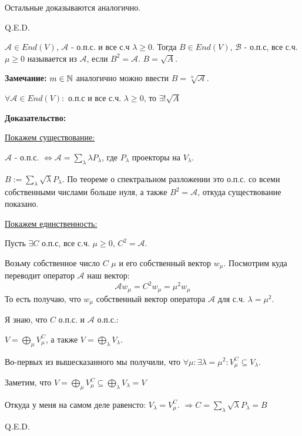 Остальные доказываются аналогично.

\hfill Q.E.D.

 $\mathcal{A} \in End(V)$, $\mathcal{A}$ - о.п.с. и все с.ч $\lambda \geq0$. Тогда $B \in End(V)$, $\mathcal{B}$ - о.п.с, все с.ч. $\mu \geq 0$ называется  из $\mathcal{A}$, если $B^2 = \mathcal{A}$. $B = \sqrt{A}$.

\textbf{Замечание:} $m \in \mathbb{N}$ аналогично можно ввести $B =\sqrt[n]{\mathcal{A}}$.


$\forall \mathcal{A}\in End(V):$ о.п.с и все с.ч. $\lambda\geq0$, то $\exists! \sqrt{A}$

\textbf{Доказательство:}

\uline{Покажем существование:}

$\mathcal{A}$ - о.п.с. $\Leftrightarrow \mathcal{A} = \sum\limits_{\lambda}\lambda P_\lambda$, где $P_\lambda $ проекторы на $V_\lambda$. 

$B:= \sum\limits_{\lambda}\sqrt{\lambda} P_\lambda$. По теореме о спектральном разложении это о.п.с. со всеми собственными числами больше нуля, а также $B^2 = \mathcal{A}$, откуда существование показано.


\uline{Покажем единственность:}

Пусть $\exists C$ о.п.с, все с.ч. $\mu \geq 0$, $C^2 = \mathcal{A}$.

Возьму собственное число $C$ $\mu$  и его собственный вектор $w_\mu$. Посмотрим куда переводит оператор $\mathcal{A}$ наш вектор:
$$\mathcal{A} w_\mu = C^2 w_\mu = \mu^2 w_\mu$$
То есть получаю, что $w_\mu$ собственный вектор оператора $\mathcal{A}$ для с.ч. $\lambda = \mu^2$.

Я знаю, что $C$ о.п.с. и $\mathcal{A}$  о.п.с.:

$V = \bigoplus\limits_\mu V_\mu^C$, а также $V = \bigoplus\limits_\lambda V_\lambda$.

Во-первых из вышесказанного мы получили, что $\forall \mu: \exists \lambda = \mu^2: V_\mu^C \subseteq V_\lambda$.

Заметим, что $V = \bigoplus\limits_\mu V_\mu^C\subseteq 
\bigoplus\limits_{\lambda}V_\lambda = V$

Откуда у меня на самом деле равенсто: $V_\lambda = V_\mu ^C$. $\Rightarrow C = \sum\limits_\lambda \sqrt{\lambda} P_\lambda = B$

\hfill Q.E.D.


